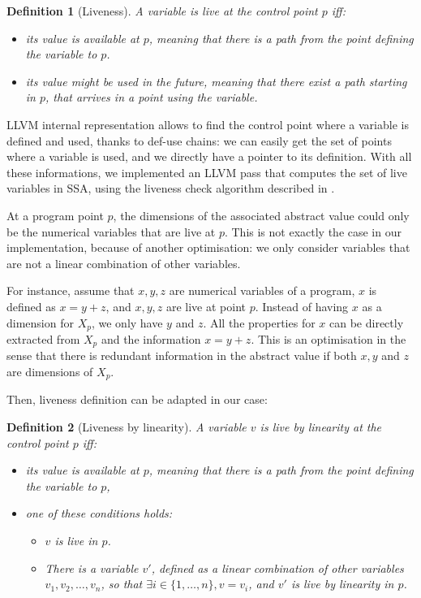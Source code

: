 \documentclass[a4paper,english,titlepage,11pt]{report}
\newtheorem{definition}{Definition}[section]
\begin{document}
	\begin{definition}[Liveness]
	A variable is \emph{live} at the control point $p$ iff:
	\begin{itemize}
	\item its value is available at $p$, meaning that there is a path from the
	point defining the variable to $p$.
	\item its value might be used in the future, meaning that there exist a path
	starting in $p$, that arrives in a point using the variable.
	\end{itemize}
	\end{definition}

	LLVM internal representation allows to find the control point where
	a variable is defined and used, thanks to def-use chains: we can
	easily get the set of points where a variable is used, and we directly have
	a pointer to its definition.
	With all these informations, we implemented an LLVM pass that computes 
	the set of live variables in SSA, using the liveness check algorithm
	described in \cite[section 3.3]{Boi10}.

	
	At a program point $p$, the dimensions of the associated abstract value could
	only be the numerical variables that are live at $p$. This is
	not exactly the case in our implementation, because of another 
	optimisation: we only consider
	variables that are not a linear combination of other variables.

	For instance, assume that $x,y,z$ are numerical variables of a program,
	$x$ is defined as $x = y+z$, and $x,y,z$ are live at point $p$. Instead of having
	$x$ as a dimension for $X_p$, we only have $y$ and $z$. All the properties
	for $x$ can be directly extracted from $X_p$ and the information $x=y+z$.
	This is an optimisation in the sense that there is redundant information in
	the abstract value if both $x,y$ and $z$ are dimensions of $X_p$.

	Then, liveness definition can be adapted in our case:

	\begin{definition}[Liveness by linearity]
	A variable $v$ is \emph{live by linearity} at the control point $p$ iff:
	\begin{itemize}
	\item 
	its value is available at $p$, meaning that there is a path from the
	point defining the variable to $p$,
	\item one of these conditions holds:
		\begin{itemize}
		\item $v$ is live in $p$.
		\item There is a variable $v'$, defined as a linear combination of other
		variables $v_1, v_2, \dots, v_n$, so that $\exists i \in \{1,\dots,n\}, v = v_i$,
		and $v'$ is live by linearity in $p$.
		\end{itemize}
	\end{itemize}
	\end{definition}
\end{document}
